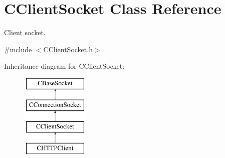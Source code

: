 \hypertarget{class_c_client_socket}{\section{\-C\-Client\-Socket \-Class \-Reference}
\label{class_c_client_socket}
}


\-Client socket.  




{\ttfamily \#include $<$\-C\-Client\-Socket.\-h$>$}

\-Inheritance diagram for \-C\-Client\-Socket\-:\begin{figure}[H]
\begin{center}
\leavevmode
\includegraphics[height=4.000000cm]{class_c_client_socket}
\end{center}
\end{figure}
